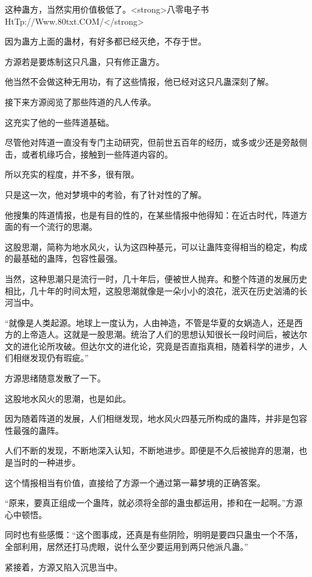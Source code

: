 
\begin{this_body}

这种蛊方，当然实用价值极低了。<strong>八零电子书HtTp://Www.80txt.COM/</strong>

因为蛊方上面的蛊材，有好多都已经灭绝，不存于世。

方源若是要炼制这只凡蛊，只有修正蛊方。

他当然不会做这种无用功，有了这些情报，他已经对这只凡蛊深刻了解。

接下来方源阅览了那些阵道的凡人传承。

这充实了他的一些阵道基础。

尽管他对阵道一直没有专门主动研究，但前世五百年的经历，或多或少还是旁敲侧击，或者机缘巧合，接触到一些阵道内容的。

所以充实的程度，并不多，很有限。

只是这一次，他对梦境中的考验，有了针对性的了解。

他搜集的阵道情报，也是有目的性的，在某些情报中他得知：在近古时代，阵道方面的有一个流行的思潮。

这股思潮，简称为地水风火，认为这四种基元，可以让蛊阵变得相当的稳定，构成的最基础的蛊阵，包容性最强。

当然，这种思潮只是流行一时，几十年后，便被世人抛弃。和整个阵道的发展历史相比，几十年的时间太短，这股思潮就像是一朵小小的浪花，泯灭在历史汹涌的长河当中。

“就像是人类起源。地球上一度认为，人由神造，不管是华夏的女娲造人，还是西方的上帝造人。这就是一股思潮。统治了人们的思想认知很长一段时间后，被达尔文的进化论所攻破。但达尔文的进化论，究竟是否直指真相，随着科学的进步，人们相继发现仍有瑕疵。”

方源思绪随意发散了一下。

这股地水风火的思潮，也是如此。

因为随着阵道的发展，人们相继发现，地水风火四基元所构成的蛊阵，并非是包容性最强的蛊阵。

人们不断的发现，不断地深入认知，不断地进步。即便是不久后被抛弃的思潮，也是当时的一种进步。

这个情报相当有价值，直接给了方源一个通过第一幕梦境的正确答案。

“原来，要真正组成一个蛊阵，就必须将全部的蛊虫都运用，掺和在一起啊。”方源心中顿悟。

同时也有些感慨：“这个图事成，还真是有些阴险，明明是要四只蛊虫一个不落，全部利用，居然还打马虎眼，说什么至少要运用到两只他派凡蛊。”

紧接着，方源又陷入沉思当中。


\end{this_body}
